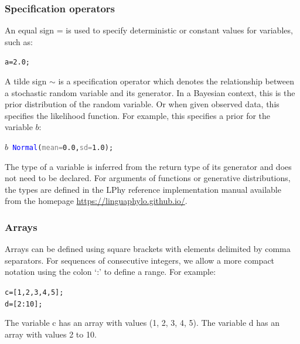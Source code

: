 \documentclass[10pt,letterpaper,table]{article}
\theoremstyle{definition}
\begin{document}
\subsubsection{Specification operators}
An equal sign = is used to specify deterministic or constant values for variables, such as: 
{
  \small
  \begin{listing}
    \begin{alltt}
    a = \textcolor{constant}{2.0};
    \end{alltt}
  \end{listing}
}
\noindent A tilde sign $\sim$ is a specification operator which denotes the relationship between a stochastic random variable and its generator. 
In a Bayesian context, this is the prior distribution of the random variable. 
Or when given observed data, this specifies the likelihood function. 
For example, this specifies a prior for the variable $b$:  
{
  \small
  \begin{listing}
    \begin{alltt}
    \textcolor{bluishgreen}{\(b\)} ~ \textcolor{blue}{Normal}(\textcolor{gray}{mean=}\textcolor{constant}{0.0}, \textcolor{gray}{sd=}\textcolor{constant}{1.0});
    \end{alltt}
  \end{listing}
}

The type of a variable is inferred from the return type of its generator and does not need to be declared. 
For arguments of functions or generative distributions, the types are defined in the LPhy reference implementation manual available from the homepage \url{https://linguaphylo.github.io/}. 

\subsubsection{Arrays}
Arrays can be defined using square brackets with elements delimited by comma separators. 
For sequences of consecutive integers, we allow a more compact notation using the colon `:' to define a range.
For example:  
{
  \small
  \begin{listing}
    \begin{alltt}
    c =[\textcolor{constant}{1}, \textcolor{constant}{2}, \textcolor{constant}{3}, \textcolor{constant}{4}, \textcolor{constant}{5}];
    d =[\textcolor{constant}{2}:\textcolor{constant}{10}];
    \end{alltt}
  \end{listing}
}
\noindent The variable c has an array with values (1, 2, 3, 4, 5). 
The variable d has an array with values 2 to 10.
\end{document}
